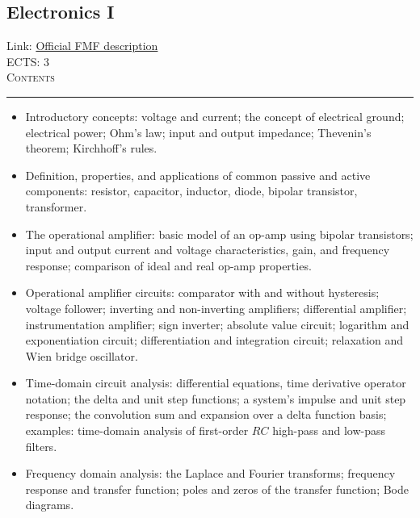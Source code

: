 \documentclass[11pt, a4paper]{article}
\newenvironment{course}[3]{
\subsection{#1}%
Link: \href{#2}{Official FMF description}\\%
ECTS: #3%
\vspace{1ex}
\\
{\large \textsc{Contents}}\\[-0.9ex]%
\rule{\textwidth}{0.5pt}
\vspace{-3ex}
}
{}
\newenvironment{chapter}[1]{
\begin{tcolorbox}[title=#1, breakable]
}
{\end{tcolorbox}}
\begin{document}
\begin{course}{Electronics I}{https://www.fmf.uni-lj.si/en/study-physics/programmes/1fiz/2020/7000777/courses/1134/}{3}
    \label{electronics_1}

    \begin{chapter}{Analog electric circuits}
        \begin{itemize}

            \item Introductory concepts: voltage and current; the concept of electrical ground; electrical power; Ohm's law; input and output impedance; Thevenin's theorem; Kirchhoff's rules.

            \item Definition, properties, and applications of common passive and active components: resistor, capacitor, inductor, diode, bipolar transistor, transformer.

            \item The operational amplifier: basic model of an op-amp using bipolar transistors; input and output current and voltage characteristics, gain, and frequency response; comparison of ideal and real op-amp properties.

            \item Operational amplifier circuits: comparator with and without hysteresis; voltage follower; inverting and non-inverting amplifiers; differential amplifier; instrumentation amplifier; sign inverter; absolute value circuit; logarithm and exponentiation circuit; differentiation and integration circuit; relaxation and Wien bridge oscillator.

        \end{itemize}
    \end{chapter}

    \begin{chapter}{Circuit analysis}
        \begin{itemize}
        
            \item Time-domain circuit analysis: differential equations, time derivative operator notation; the delta and unit step functions; a system's impulse and unit step response; the convolution sum and expansion over a delta function basis; examples: time-domain analysis of first-order $ RC $ high-pass and low-pass filters.

            \item Frequency domain analysis: the Laplace and Fourier transforms; frequency response and transfer function; poles and zeros of the transfer function; Bode diagrams.


\end{itemize}
\end{chapter}
\end{course}
\end{document}
